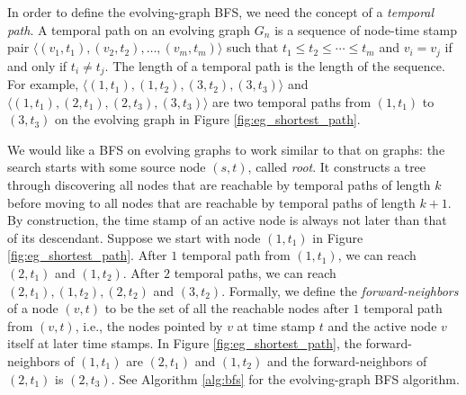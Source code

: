 \documentclass[11pt,conference,compsocconf]{IEEEtran}
\theoremstyle{definition}
\begin{document}
In order to define the evolving-graph BFS, we need the concept of a
\emph{temporal path}.
A temporal path on an evolving graph $G_n$ is a sequence of node-time stamp
pair $\langle (v_1, t_1), (v_2, t_2), \ldots, (v_m, t_m) \rangle$ such that
$t_1 \leq t_2 \leq \cdots \leq t_m$ and $v_i = v_j$ if and only if
$t_i \ne t_j$. The length of a temporal path is the length of the sequence.
For example, $\langle (1, t_1), (1, t_2), (3, t_2), (3, t_3) \rangle$ and
$\langle (1, t_1), (2, t_1), (2, t_3), (3, t_3) \rangle$
are two temporal paths from $(1, t_1)$ to $(3, t_3)$
on the evolving graph in Figure \ref{fig:eg_shortest_path}.

We would like a BFS on evolving graphs to work similar to that on graphs: the search starts with some source node $(s,t)$, called \emph{root}. It constructs a tree through discovering all nodes that are reachable by
temporal paths of length $k$ before moving to all nodes that are reachable by
 temporal paths of length $k+1$.
By construction, the time stamp of an active node is always not later than
that of its descendant. Suppose we
start with node $(1, t_1)$ in Figure \ref{fig:eg_shortest_path}.
After $1$ temporal path from $(1, t_1)$, we can reach
$(2, t_1)$ and $(1, t_2)$. After $2$ temporal paths, we can reach
$(2, t_1), (1, t_2), (2, t_2)$ and $(3, t_2)$.
Formally, we define the \emph{forward-neighbors} of a node $(v, t)$ to
be the set of all the reachable nodes after $1$ temporal path from
$(v, t)$, i.e., the nodes pointed by $v$ at time stamp $t$ and
the active node $v$ itself at later time stamps. In Figure
\ref{fig:eg_shortest_path},
the forward-neighbors of $(1, t_1)$  are $(2, t_1)$ and $(1, t_2)$ and
the forward-neighbors of $(2, t_1)$ is $(2, t_3)$.
See Algorithm  \ref{alg:bfs} for the evolving-graph BFS algorithm.
\end{document}

